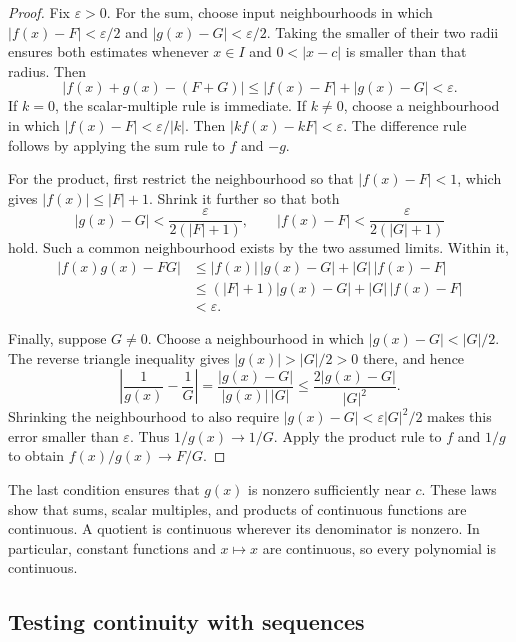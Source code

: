 \begin{proof}
  Fix $\varepsilon>0$. For the sum, choose input neighbourhoods in which
  $|f(x)-F|<\varepsilon/2$ and $|g(x)-G|<\varepsilon/2$.
  Taking the smaller of their two radii ensures both estimates whenever
  $x\in I$ and $0<|x-c|$ is smaller than that radius. Then
  \[
    |f(x)+g(x)-(F+G)|
      \le |f(x)-F|+|g(x)-G|<\varepsilon.
  \]
  If $k=0$, the scalar-multiple rule is immediate. If $k\ne0$, choose
  a neighbourhood in which $|f(x)-F|<\varepsilon/|k|$. Then
  $|kf(x)-kF|<\varepsilon$. The difference rule follows by applying
  the sum rule to $f$ and $-g$.

  For the product, first restrict the neighbourhood so that
  $|f(x)-F|<1$, which gives $|f(x)|\le |F|+1$. Shrink it further so
  that both
  \[
    |g(x)-G|<\frac{\varepsilon}{2(|F|+1)},\qquad
    |f(x)-F|<\frac{\varepsilon}{2(|G|+1)}
  \]
  hold. Such a common neighbourhood exists by the two assumed limits.
  Within it,
  \begin{align*}
    |f(x)g(x)-FG|
      &\le |f(x)|\,|g(x)-G|+|G|\,|f(x)-F|\\
      &\le (|F|+1)|g(x)-G|+|G|\,|f(x)-F|\\
      &<\varepsilon.
  \end{align*}

  Finally, suppose $G\ne0$. Choose a neighbourhood in which
  $|g(x)-G|<|G|/2$. The reverse triangle inequality gives
  $|g(x)|>|G|/2>0$ there, and hence
  \[
    \left|\frac1{g(x)}-\frac1G\right|
      =\frac{|g(x)-G|}{|g(x)|\,|G|}
      \le\frac{2|g(x)-G|}{|G|^2}.
  \]
  Shrinking the neighbourhood to also require
  $|g(x)-G|<\varepsilon|G|^2/2$ makes this error smaller than
  $\varepsilon$. Thus $1/g(x)\to1/G$. Apply the product rule to
  $f$ and $1/g$ to obtain $f(x)/g(x)\to F/G$.
\end{proof}



The last condition ensures that $g(x)$ is nonzero sufficiently near $c$.
These laws show that sums, scalar multiples, and products of continuous
functions are continuous. A quotient is continuous wherever its denominator
is nonzero. In particular, constant functions and $x\mapsto x$ are
continuous, so every polynomial is continuous.




\subsection{Testing continuity with sequences}


